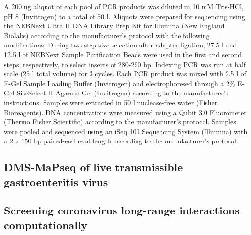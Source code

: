 \documentclass[main.tex]{subfiles}
\begin{document}
A 200 ng aliquot of each pool of PCR products was diluted in 10 mM Tris-HCl, pH 8 (Invitrogen) to a total of 50 \textmu l.
Aliquots were prepared for sequencing using the NEBNext Ultra II DNA Library Prep Kit for Illumina (New England Biolabs) according to the manufacturer's protocol with the following modifications.
During two-step size selection after adapter ligation, 27.5 \textmu l and 12.5 \textmu l of NEBNext Sample Purification Beads were used in the first and second steps, respectively, to select inserts of 280-290 bp.
Indexing PCR was run at half scale (25 \textmu l total volume) for 3 cycles.
Each PCR product was mixed with 2.5 \textmu l of E-Gel Sample Loading Buffer (Invitrogen) and electrophoresed through a 2\% E-Gel SizeSelect II Agarose Gel (Invitrogen) according to the manufacturer's instructions.
Samples were extracted in 50 \textmu l nuclease-free water (Fisher Bioreagents).
DNA concentrations were measured using a Qubit 3.0 Fluorometer (Thermo Fisher Scientific) according to the manufacturer's protocol.
Samples were pooled and sequenced using an iSeq 100 Sequencing System (Illumina) with a 2 x 150 bp paired-end read length according to the manufacturer's protocol.

\subsection{DMS-MaPseq of live transmissible gastroenteritis virus}


\subsection{Screening coronavirus long-range interactions computationally}
\label{screen_lri_comp}
\end{document}
